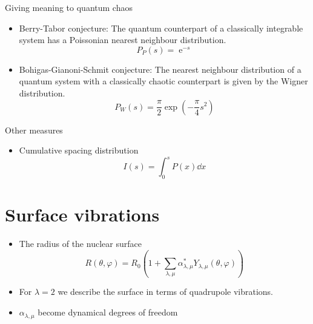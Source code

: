 \documentclass[a4,compress]{beamer}
\newcommand{\ee}{\operatorname{e}}          %
\begin{document}

\begin{frame}{Giving meaning to quantum chaos}
  \begin{itemize}
    \item Berry-Tabor conjecture: The quantum counterpart of a classically integrable
    system has a Poissonian nearest neighbour distribution.
    \[
      P_P(s) = \ee^{-s}
    \]
    \item Bohigas-Gianoni-Schmit conjecture: The nearest neighbour distribution
    of a quantum system with a classically chaotic counterpart is given by
    the Wigner distribution.
    \[
      P_W(s) = \frac{\pi}{2} \exp(-\frac{\pi}{4} s^2)
    \]
  \end{itemize}
\end{frame}


\begin{frame}{Other measures}
  \begin{itemize}
    \item Cumulative spacing distribution
    \[
      I(s) = \int_0^s P(x) \dd{x}
    \]
  \end{itemize}
\end{frame}

\section[Model]{Surface vibrations}


\begin{frame}
  \begin{itemize}
    \item The radius of the nuclear surface
    \[
      R(\theta, \varphi) = R_0 \left( 1 + \sum_{\lambda, \mu}
          \alpha_{\lambda,\mu}^* Y_{\lambda,\mu}(\theta, \varphi) \right)
    \]
    \item For \(\lambda = 2\) we describe the surface in terms of
    quadrupole vibrations.
    \item \(\alpha_{\lambda,\mu}\) become dynamical degrees of freedom
  \end{itemize}
\end{frame}

\end{document}
